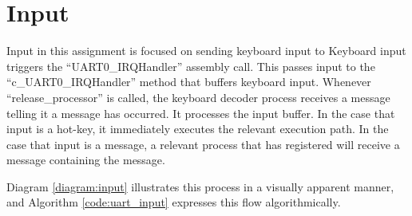 \documentclass[12pt]{report}
\begin{document}
\section{Input}
    Input in this assignment is focused on sending keyboard input to
    Keyboard input triggers the ``UART0\_IRQHandler'' assembly call. This
    passes input to the ``c\_UART0\_IRQHandler'' method that buffers keyboard
    input. Whenever ``release\_processor'' is called, the keyboard decoder
    process receives a message telling it a message has occurred. It processes
    the input buffer. In the case that input is a hot-key, it immediately
    executes the relevant execution path. In the case that input is a message, a
    relevant process that has registered will receive a message containing the
    message.

    Diagram \ref{diagram:input} illustrates this process in a visually
    apparent manner, and Algorithm \ref{code:uart_input} expresses this flow
    algorithmically.

\end{document}
